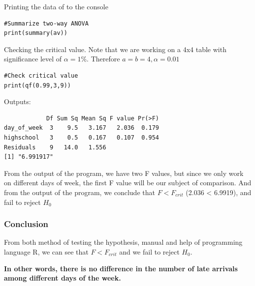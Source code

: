 \documentclass[a4paper]{article}
\numberwithin{equation}{section}
\begin{document}
Printing the data of to the console

\begin{mdframed}[leftline=false,rightline=false,backgroundcolor=magenta!10,nobreak=true]
  \begin{verbatim}
#Summarize two-way ANOVA
print(summary(av))
  \end{verbatim}
\end{mdframed}

Checking the critical value. Note that we are working on a 4x4 table with significance level of \(\alpha = 1\% \). Therefore \(a = b = 4, \alpha = 0.01\)

\begin{mdframed}[leftline=false,rightline=false,backgroundcolor=magenta!10,nobreak=true]
  \begin{verbatim}
#Check critical value
print(qf(0.99,3,9))
  \end{verbatim}
\end{mdframed}

Outputs:
\begin{mdframed}[leftline=false,rightline=false,backgroundcolor=gray!10,nobreak=true]
  \begin{verbatim}
            Df Sum Sq Mean Sq F value Pr(>F)
day_of_week  3    9.5   3.167   2.036  0.179
highschool   3    0.5   0.167   0.107  0.954
Residuals    9   14.0   1.556
[1] "6.991917"
  \end{verbatim}
\end{mdframed}

From the output of the program, we have two F values, but since we only work on different days of week, the first F value will be our subject of comparison. And from the output of the program, we conclude that \(F < F_{crit}\) (2.036 < 6.9919), and fail to reject \(H_0\)

\subsubsection{Conclusion}
From both method of testing the hypothesis, manual and help of programming language R, we can see that \(F < F_{crit}\) and we fail to reject \(H_0\).

\textbf{In other words, there is no difference in the number of late arrivals among different days of the week.}

\newpage
\end{document}

